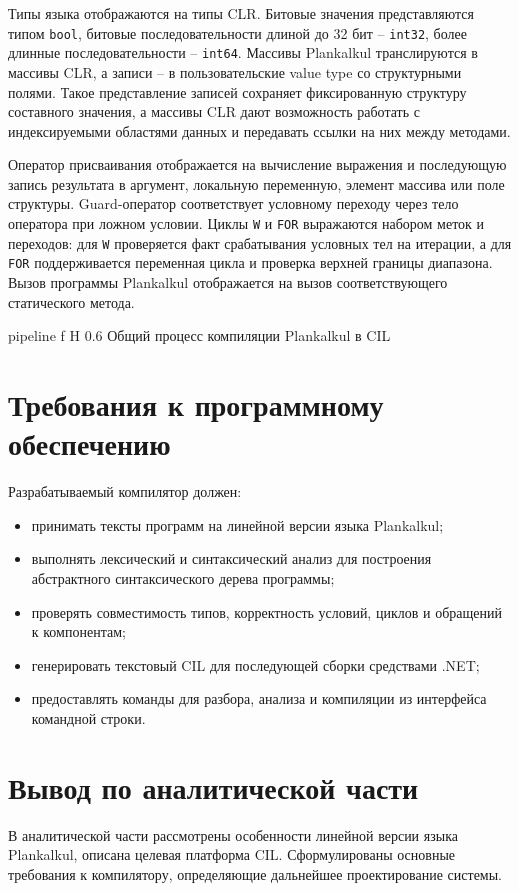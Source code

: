 Типы языка отображаются на типы CLR.
Битовые значения представляются типом \texttt{bool}, битовые последовательности длиной до 32 бит -- \texttt{int32}, более длинные последовательности -- \texttt{int64}.
Массивы Plankalkul транслируются в массивы CLR, а записи -- в пользовательские value type со структурными полями.
Такое представление записей сохраняет фиксированную структуру составного значения, а массивы CLR дают возможность работать с индексируемыми областями данных и передавать ссылки на них между методами.

Оператор присваивания отображается на вычисление выражения и последующую запись результата в аргумент, локальную переменную, элемент массива или поле структуры.
Guard-оператор соответствует условному переходу через тело оператора при ложном условии.
Циклы \texttt{W} и \texttt{FOR} выражаются набором меток и переходов: для \texttt{W} проверяется факт срабатывания условных тел на итерации, а для \texttt{FOR} поддерживается переменная цикла и проверка верхней границы диапазона.
Вызов программы Plankalkul отображается на вызов соответствующего статического метода.

	{pipeline}
	{f}
	{H}
	{0.6\textwidth}
	{Общий процесс компиляции Plankalkul в CIL}

\section{Требования к программному обеспечению}
Разрабатываемый компилятор должен:
\begin{itemize}
	\item принимать тексты программ на линейной версии языка Plankalkul;
	\item выполнять лексический и синтаксический анализ для построения абстрактного синтаксического дерева программы;
	\item проверять совместимость типов, корректность условий, циклов и обращений к компонентам;
	\item генерировать текстовый CIL для последующей сборки средствами .NET;
	\item предоставлять команды для разбора, анализа и компиляции из интерфейса командной строки.
\end{itemize}

\section*{Вывод по аналитической части}
В аналитической части рассмотрены особенности линейной версии языка Plankalkul, описана целевая платформа CIL.
Сформулированы основные требования к компилятору, определяющие дальнейшее проектирование системы.
